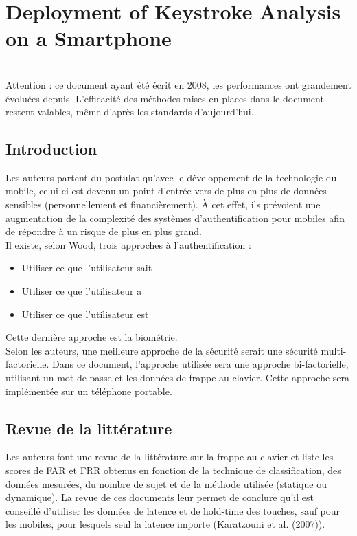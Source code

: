 \section{Deployment of Keystroke Analysis on a Smartphone\cite{buchoux2008}}

\\

Attention : ce document ayant été écrit en 2008, les performances ont grandement évoluées depuis. L'efficacité des méthodes mises en places dans le document restent valables, même d'après les standards d'aujourd'hui.

\subsection{Introduction}

Les auteurs partent du postulat qu'avec le développement de la technologie du mobile, celui-ci est devenu un point d'entrée vers de plus en plus de données sensibles (personnellement et financièrement). À cet effet, ils prévoient une augmentation de la complexité des systèmes d'authentification pour mobiles afin de répondre à un risque de plus en plus grand.\\

Il existe, selon Wood, trois approches à l'authentification :\\

\begin{itemize}
  \item Utiliser ce que l'utilisateur sait
  \item Utiliser ce que l'utilisateur a
  \item Utiliser ce que l'utilisateur est\\
\end{itemize}

Cette dernière approche est la biométrie.\\

Selon les auteurs, une meilleure approche de la sécurité serait une sécurité multi-factorielle. Dans ce document, l'approche utilisée sera une approche bi-factorielle, utilisant un mot de passe et les données de frappe au clavier. Cette approche sera implémentée sur un téléphone portable.

\subsection{Revue de la littérature}

Les auteurs font une revue de la littérature sur la frappe au clavier et liste les scores de FAR et FRR obtenus en fonction de la technique de classification, des données mesurées, du nombre de sujet et de la méthode utilisée (statique ou dynamique). La revue de ces documents leur permet de conclure qu'il est conseillé d'utiliser les données de latence et de hold-time des touches, sauf pour les mobiles, pour lesquels seul la latence importe (Karatzouni et al. (2007)).


